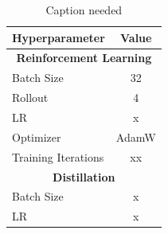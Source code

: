 \begin{table}[H]
\caption{Caption needed}
\centering
\begin{tabular}{l|c}
\toprule
Hyperparameter & Value \\
\midrule
 \multicolumn{2}{c}{\textbf{Reinforcement Learning}} \\
\midrule
Batch Size & 32 \\
Rollout & 4 \\
LR & x \\
Optimizer & AdamW \\
Training Iterations & xx \\
\midrule
\multicolumn{2}{c}{\textbf{Distillation}} \\
\midrule
Batch Size & x \\
LR & x \\
\bottomrule
\end{tabular}
\label{tab:sft_hyperparamater}
\end{table}